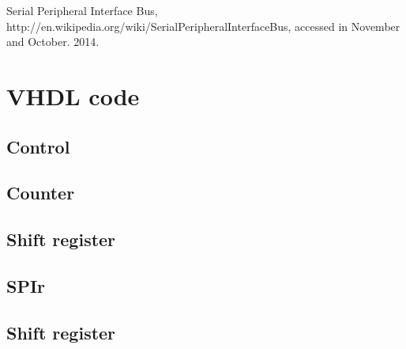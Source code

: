 \documentclass[11pt,twoside,a4paper]{article}
\begin{document}
\begin{thebibliography}{3}
Serial Peripheral Interface Bus, 
http://en.wikipedia.org/wiki/Serial\textunderscore Peripheral\textunderscore Interface\textunderscore Bus,
accessed in November and October. 2014.
\end{thebibliography}

\section{VHDL code}
\subsection{Control}
\label{control-vhdl}
 
\subsection{Counter}
\label{counter-vhdl}
 
\subsection{Shift register}
\label{shift-reg-vhdl}
 
\subsection{SPIr}
\label{spi-vhdl}
 
\subsection{Shift register}
\label{spi-tb-vhdl}
 
\end{document}
